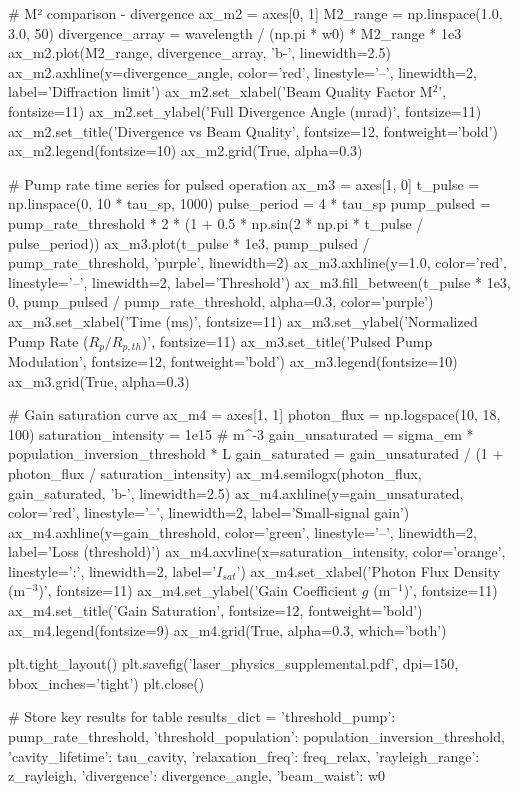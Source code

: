 \documentclass[a4paper, 11pt]{article}
\begin{document}
\begin{pycode}
# M² comparison - divergence
ax_m2 = axes[0, 1]
M2_range = np.linspace(1.0, 3.0, 50)
divergence_array = wavelength / (np.pi * w0) * M2_range * 1e3
ax_m2.plot(M2_range, divergence_array, 'b-', linewidth=2.5)
ax_m2.axhline(y=divergence_angle, color='red', linestyle='--', linewidth=2, label='Diffraction limit')
ax_m2.set_xlabel('Beam Quality Factor M$^2$', fontsize=11)
ax_m2.set_ylabel('Full Divergence Angle (mrad)', fontsize=11)
ax_m2.set_title('Divergence vs Beam Quality', fontsize=12, fontweight='bold')
ax_m2.legend(fontsize=10)
ax_m2.grid(True, alpha=0.3)

# Pump rate time series for pulsed operation
ax_m3 = axes[1, 0]
t_pulse = np.linspace(0, 10 * tau_sp, 1000)
pulse_period = 4 * tau_sp
pump_pulsed = pump_rate_threshold * 2 * (1 + 0.5 * np.sin(2 * np.pi * t_pulse / pulse_period))
ax_m3.plot(t_pulse * 1e3, pump_pulsed / pump_rate_threshold, 'purple', linewidth=2)
ax_m3.axhline(y=1.0, color='red', linestyle='--', linewidth=2, label='Threshold')
ax_m3.fill_between(t_pulse * 1e3, 0, pump_pulsed / pump_rate_threshold, alpha=0.3, color='purple')
ax_m3.set_xlabel('Time (ms)', fontsize=11)
ax_m3.set_ylabel('Normalized Pump Rate ($R_p / R_{p,th}$)', fontsize=11)
ax_m3.set_title('Pulsed Pump Modulation', fontsize=12, fontweight='bold')
ax_m3.legend(fontsize=10)
ax_m3.grid(True, alpha=0.3)

# Gain saturation curve
ax_m4 = axes[1, 1]
photon_flux = np.logspace(10, 18, 100)
saturation_intensity = 1e15  # m^-3
gain_unsaturated = sigma_em * population_inversion_threshold * L
gain_saturated = gain_unsaturated / (1 + photon_flux / saturation_intensity)
ax_m4.semilogx(photon_flux, gain_saturated, 'b-', linewidth=2.5)
ax_m4.axhline(y=gain_unsaturated, color='red', linestyle='--', linewidth=2, label='Small-signal gain')
ax_m4.axhline(y=gain_threshold, color='green', linestyle='--', linewidth=2, label='Loss (threshold)')
ax_m4.axvline(x=saturation_intensity, color='orange', linestyle=':', linewidth=2, label='$I_{sat}$')
ax_m4.set_xlabel('Photon Flux Density (m$^{-3}$)', fontsize=11)
ax_m4.set_ylabel('Gain Coefficient $g$ (m$^{-1}$)', fontsize=11)
ax_m4.set_title('Gain Saturation', fontsize=12, fontweight='bold')
ax_m4.legend(fontsize=9)
ax_m4.grid(True, alpha=0.3, which='both')

plt.tight_layout()
plt.savefig('laser_physics_supplemental.pdf', dpi=150, bbox_inches='tight')
plt.close()

# Store key results for table
results_dict = {
    'threshold_pump': pump_rate_threshold,
    'threshold_population': population_inversion_threshold,
    'cavity_lifetime': tau_cavity,
    'relaxation_freq': freq_relax,
    'rayleigh_range': z_rayleigh,
    'divergence': divergence_angle,
    'beam_waist': w0
}
\end{pycode}
\end{document}
